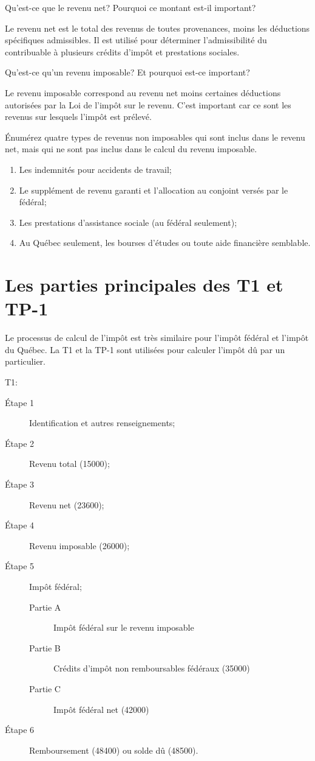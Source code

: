 \begin{question}
	Qu'est-ce que le revenu net? Pourquoi ce montant est-il important?
\end{question}
Le \og revenu net\fg{} est le total des revenus de toutes provenances, moins les déductions spécifiques admissibles. Il est utilisé pour déterminer l'admissibilité du contribuable à plusieurs crédits d'impôt et prestations sociales.

\begin{question}
	Qu'est-ce qu'un \og revenu imposable\fg{}? Et pourquoi est-ce important?
\end{question}
Le revenu imposable correspond au revenu net moins certaines déductions autorisées par la Loi de l'impôt sur le revenu. C'est important car ce sont les revenus sur lesquels l'impôt est prélevé.

\begin{question}
	Énumérez quatre types de revenus non imposables qui sont inclus dans le revenu net, mais qui ne sont pas inclus dans le calcul du revenu imposable.
\end{question}
\begin{enumerate}
	\item Les indemnités pour accidents de travail;
	\item Le supplément de revenu garanti et l'allocation au conjoint versés par le fédéral;
	\item Les prestations d'assistance sociale (au fédéral seulement);
	\item Au Québec seulement, les bourses d'études ou toute aide financière semblable.
\end{enumerate}



\section{Les parties principales des T1 et TP-1}
\begin{intro}
	Le processus de calcul de l'impôt est très similaire pour l'impôt fédéral et l'impôt du Québec. La T1 et la TP-1 sont utilisées pour calculer l'impôt dû par un particulier.
\end{intro}
T1:
\ca
\begin{description}
	\item[Étape 1] Identification et autres renseignements;
	\item[Étape 2] Revenu total (15000);
	\item[Étape 3] Revenu net (23600);
	\item[Étape 4] Revenu imposable (26000);
	\item[Étape 5] Impôt fédéral;
	\begin{description}
		\item[Partie A] Impôt fédéral sur le revenu imposable
		\item[Partie B] Crédits d'impôt non remboursables fédéraux (35000)
		\item[Partie C] Impôt fédéral net (42000)
	\end{description}
	\item[Étape 6] Remboursement (48400) ou solde dû (48500).
\end{description}

